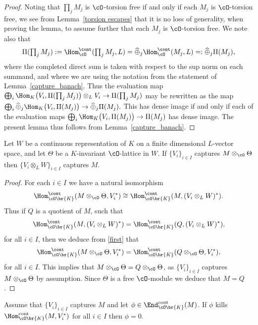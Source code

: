 \begin{proof}
Noting that $\prod_j M_j$ is $\cO$-torsion free if and only if each
$M_j$ is $\cO$-torsion free, we see from Lemma~\ref{torsion escapes}
that it is no loss of generality, when proving the lemma, to assume
further that each $M_j$ is $\cO$-torsion free. We note also that
\[\textstyle
\Pi(\prod_j M_j) := \Hom^{\cont}_{\cO}(\prod_j M_j, L) = \widehat{\oplus}_j
\Hom^{\cont}_{\cO}(M_j, L) =: \widehat{\oplus}_j \Pi(M_j),
\]
where the completed direct sum is taken with respect to the sup norm on
each summand, and where we are using the notation from the statement
of Lemma~\ref{capture_banach}.
Thus the evaluation map
$\bigoplus_i \Hom_K\bigl(V_i, \Pi(\prod_j M_j )\bigr) \otimes_L V_i
\to \Pi(\prod_j M_j)$
may be rewritten as the map
$\bigoplus_i \widehat{\oplus}_j \Hom_K\bigl(V_i, \Pi(M_j)\bigr)
\to \widehat{\oplus}_j \Pi(M_j).$
This has dense image if and only if each of the evaluation maps
$\bigoplus_i \Hom_K\bigl(V_i, \Pi(M_j)\bigr) \to \Pi(M_j)$
has dense image. The present lemma thus follows from
Lemma~\ref{capture_banach}.
\end{proof}

\begin{lem}\label{weight} Let $W$ be a continuous representation of $K$ on a finite dimensional $L$\nobreakdash-vector space, and let $\Theta$ be a $K$-invariant $\cO$-lattice in $W$.
If $\{V_i\}_{i\in I}$ captures $M\otimes_{\cO} \Theta$ then $\{V_i\otimes_L W\}_{i\in I}$ captures $M$.
\end{lem}

\begin{proof} For each $i\in I$ we have a natural isomorphism
\begin{equation}\label{first}
\Hom_{\cO\br{K}}^{\cont}(M\otimes_{\cO} \Theta, V_i^*)\cong \Hom_{\cO\br{K}}^{\cont}(M, (V_i\otimes_L W)^*).
\end{equation}
Thus if $Q$ is a quotient of $M$, such that
\[
\Hom_{\cO\br{K}}^{\cont}(M, (V_i\otimes_L W)^*)=\Hom_{\cO\br{K}}^{\cont}(Q, (V_i\otimes_L W)^*),
\]
for all $i\in I$, then we deduce from
\eqref{first} that
\[
\Hom_{\cO\br{K}}^{\cont}(M\otimes_{\cO} \Theta, V_i^*)=\Hom_{\cO\br{K}}^{\cont}(Q\otimes_{\cO} \Theta, V_i^*),
\]
for all $i\in I$. This implies that
$M\otimes_{\cO} \Theta= Q\otimes_{\cO} \Theta$, as $\{V_i\}_{i\in I}$ captures $M\otimes_{\cO} \Theta$ by assumption. Since $\Theta$ is a free $\cO$-module we deduce that
$M=Q$.
\end{proof}

\begin{lem}\label{faithful} Assume that $\{ V_i\}_{i\in I}$ captures $M$ and let $\phi\in \End_{\cO\br{K}}^{\rm cont}(M)$. If $\phi$ kills
$\Hom_{\cO\br{K}}^{\rm cont}(M, V_i^*)$ for all $i\in I$ then $\phi=0$.
\end{lem}

